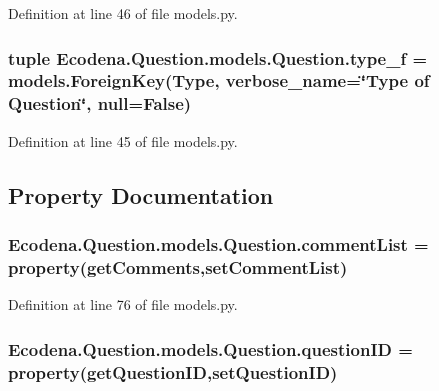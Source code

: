 Definition at line 46 of file models.py.

\hypertarget{class_ecodena_1_1_question_1_1models_1_1_question_ae09f8ef0052f7c65df2383940124d5ce}{
\subsubsection[{type\_\-f}]{\setlength{\rightskip}{0pt plus 5cm}tuple {\bf Ecodena.Question.models.Question.type\_\-f} = models.ForeignKey({\bf Type}, verbose\_\-name=\char`\"{}Type of {\bf Question}\char`\"{}, null=False)}}
\label{d1/d67/class_ecodena_1_1_question_1_1models_1_1_question_ae09f8ef0052f7c65df2383940124d5ce}


Definition at line 45 of file models.py.



\subsection{Property Documentation}
\hypertarget{class_ecodena_1_1_question_1_1models_1_1_question_a932bd57bcdb185606aa6889ae0880a57}{
\subsubsection[{commentList}]{\setlength{\rightskip}{0pt plus 5cm}Ecodena.Question.models.Question.commentList = property(getComments,setCommentList)}}
\label{d1/d67/class_ecodena_1_1_question_1_1models_1_1_question_a932bd57bcdb185606aa6889ae0880a57}


Definition at line 76 of file models.py.

\hypertarget{class_ecodena_1_1_question_1_1models_1_1_question_a24c1bdd9f3464af160aa43c9c224f19a}{
\subsubsection[{questionID}]{\setlength{\rightskip}{0pt plus 5cm}Ecodena.Question.models.Question.questionID = property(getQuestionID,setQuestionID)}}
\label{d1/d67/class_ecodena_1_1_question_1_1models_1_1_question_a24c1bdd9f3464af160aa43c9c224f19a}



